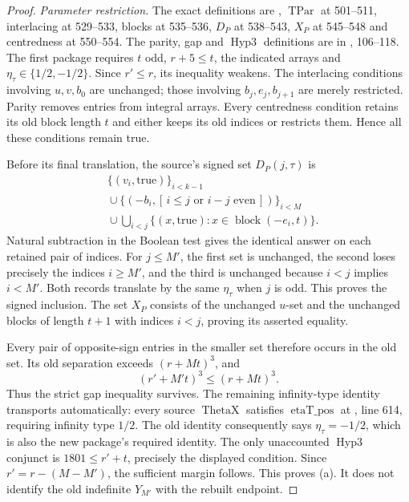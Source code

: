 \documentclass[11pt,a4paper]{article}
\theoremstyle{definition}\newtheorem{remark}[theorem]{Remark}
\begin{document}
\begin{proof}
\textit{Parameter restriction.}
The exact definitions are
,
$\operatorname{TPar}$ at 501--511, interlacing at 529--533, blocks at 535--536,
$D_P$ at 538--543, $X_P$ at 545--548 and centredness at 550--554.
The parity, gap and $\operatorname{Hyp3}$ definitions are in
,
106--118.
The first package requires $t$ odd, $r+5\le t$, the indicated arrays and
$\eta_\tau\in\{1/2,-1/2\}$. Since $r'\le r$, its inequality weakens.
The interlacing conditions involving $u,v,b_0$ are unchanged; those involving
$b_j,e_j,b_{j+1}$ are merely restricted. Parity removes entries from integral
arrays. Every centredness condition retains its old block length $t$ and
either keeps its old indices or restricts them. Hence all these conditions
remain true.

Before its final translation, the source's signed set $D_P(j,\tau)$ is
\[
 \begin{aligned}
 &\{(v_i,\mathrm{true})\}_{i<k-1}\\
 &{}\cup\{(-b_i,[\,i\le j\text{ or }i-j\text{ even}\,])\}_{i<M}\\
 &{}\cup\bigcup_{i<j}\{(x,\mathrm{true}):x\in\operatorname{block}(-e_i,t)\}.
 \end{aligned}
\]
Natural subtraction in the Boolean test gives the identical answer on
each retained pair of indices. For $j\le M'$, the first set is unchanged,
the second loses precisely the indices $i\ge M'$, and the third is unchanged
because $i<j$ implies $i<M'$. Both records translate by the same $\eta_\tau$
when $j$ is odd. This proves the signed inclusion.
The set $X_P$ consists of the unchanged $u$-set and the unchanged blocks
of length $t+1$ with indices $i<j$, proving its asserted equality.

Every pair of opposite-sign entries in the smaller set therefore occurs in
the old set. Its old separation exceeds $(r+Mt)^3$, and
\[
 (r'+M't)^3\le(r+Mt)^3.
\]
Thus the strict gap inequality survives.
The remaining infinity-type identity transports automatically:
every source $\operatorname{ThetaX}$ satisfies $\operatorname{etaT\_pos}$
at , line 614, requiring infinity type $1/2$.
The old identity consequently says $\eta_\tau=-1/2$, which is also the
new package's required identity.
The only unaccounted $\operatorname{Hyp3}$ conjunct is
$1801\le r'+t$, precisely the displayed condition.
Since $r'=r-(M-M')$, the sufficient margin follows. This proves (a).
It does not identify the old indefinite $Y_{M'}$ with the rebuilt endpoint.


\end{proof}
\end{document}
